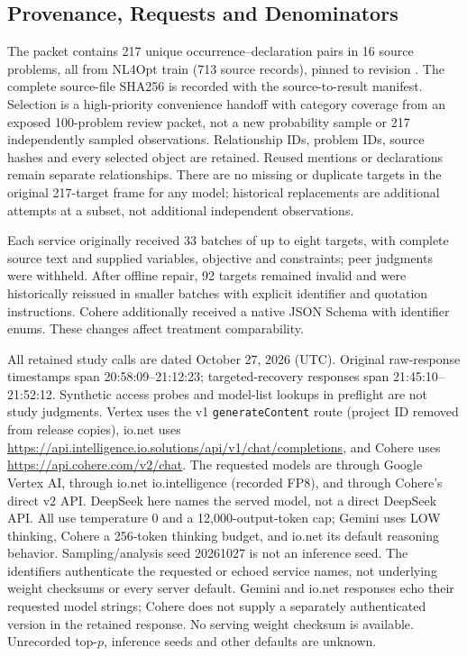 \subsection{Provenance, Requests and Denominators}\label{app:relationship-evidence}
The packet contains 217 unique occurrence--declaration pairs in 16 source problems, all from NL4Opt train (713 source records), pinned to revision . The complete source-file SHA256 is recorded with the source-to-result manifest. Selection is a high-priority convenience handoff with category coverage from an exposed 100-problem review packet, not a new probability sample or 217 independently sampled observations. Relationship IDs, problem IDs, source hashes and every selected object are retained. Reused mentions or declarations remain separate relationships. There are no missing or duplicate targets in the original 217-target frame for any model; historical replacements are additional attempts at a subset, not additional independent observations.

Each service originally received 33 batches of up to eight targets, with complete source text and supplied variables, objective and constraints; peer judgments were withheld. After offline repair, 92 targets remained invalid and were historically reissued in smaller batches with explicit identifier and quotation instructions. Cohere additionally received a native JSON Schema with identifier enums. These changes affect treatment comparability.

All retained study calls are dated October 27, 2026 (UTC). Original raw-response timestamps span 20:58:09--21:12:23; targeted-recovery responses span 21:45:10--21:52:12. Synthetic access probes and model-list lookups in preflight are not study judgments. Vertex uses the v1 \texttt{generateContent} route (project ID removed from release copies), io.net uses \url{https://api.intelligence.io.solutions/api/v1/chat/completions}, and Cohere uses \url{https://api.cohere.com/v2/chat}. The requested models are  through Google Vertex AI,  through io.net io.intelligence (recorded FP8), and  through Cohere's direct v2 API. DeepSeek here names the served model, not a direct DeepSeek API. All use temperature 0 and a 12,000-output-token cap; Gemini uses LOW thinking, Cohere a 256-token thinking budget, and io.net its default reasoning behavior. Sampling/analysis seed 20261027 is not an inference seed. The identifiers authenticate the requested or echoed service names, not underlying weight checksums or every server default. Gemini and io.net responses echo their requested model strings; Cohere does not supply a separately authenticated version in the retained response. No serving weight checksum is available. Unrecorded top-$p$, inference seeds and other defaults are unknown.

